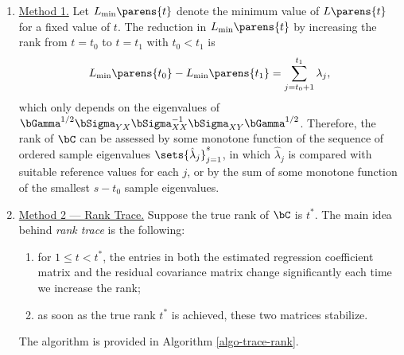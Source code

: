 \documentclass[12pt]{article}
\begin{document}
\begin{enumerate}[label=\textbf{\arabic*.}]
\begin{enumerate}
		\begin{enumerate}
			\item \underline{Method 1.} Let $L_{\min} \parens{t}$ denote the minimum value of $L \parens{t}$ for a fixed value of $t$. The reduction in $L_{\min} \parens{t}$ by increasing the rank from $t = t_0$ to $t = t_1$ with $t_0 < t_1$ is 
			\begin{align*}
				L_{\min} \parens{t_0} - L_{\min} \parens{t_1} = \sum_{j=t_0+1}^{t_1} \lambda_j, 
			\end{align*}
			which only depends on the eigenvalues of $\bGamma^{1/2} \bSigma_{YX} \bSigma_{XX}^{-1} \bSigma_{XY} \bGamma^{1/2}$. 
			Therefore, the rank of $\bC$ can be assessed by some monotone function of the sequence of ordered sample eigenvalues $\sets{\hat{\lambda}_j}_{j = 1}^{s}$, in which $\hat{\lambda}_j$ is compared with suitable reference values for each $j$, or by the sum of some monotone function of the smallest $s-t_0$ sample eigenvalues. 
			
			\item \underline{Method 2 --- Rank Trace.} Suppose the true rank of $\bC$ is $t^*$. The main idea behind \textit{rank trace} is the following: 
			\begin{enumerate}
				\item for $1 \le t < t^*$, the entries in both the estimated regression coefficient matrix and the residual covariance matrix change significantly each time we increase the rank; 
				\item as soon as the true rank $t^*$ is achieved, these two matrices stabilize. 
			\end{enumerate}
			The algorithm is provided in Algorithm \ref{algo-trace-rank}. 
			

\end{enumerate}
\end{enumerate}
\end{enumerate}
\end{document}
